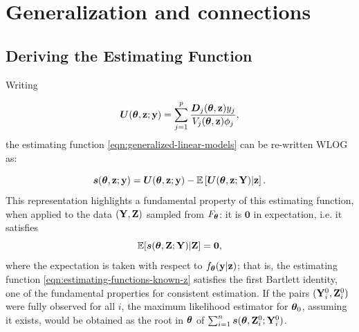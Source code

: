 \documentclass[twoside,11pt]{article}
\newcommand{\E}{{\mathbb{E}}}
\begin{document}
\section{Generalization and connections}

\subsection{Deriving the Estimating Function}

 Writing

\begin{equation}
    \bm U({\bm{\theta}}, {\bf z};{\bf y}) = \sum_{j=1}^p\frac{\bm D_j({\bm{\theta}}, {\bf z}) y_{j} }{V_j({\bm{\theta}}, {\bf z})\phi_j},
    \label{eqn:Psi}
\end{equation}
%
the estimating function \eqref{eqn:generalized-linear-models} can be re-written WLOG as:

%
\begin{equation}
\bm s(\bt, \z; \y) = \bm U(\bt, \z; \y) - \E\left[\bm U(\bt, \z; \Y)\Large\vert\z \right].
\label{eqn:estimating-functions-known-z}
\end{equation}
%
This representation highlights a fundamental property of this estimating function, when applied to the data $({\bf Y}, {\bf Z})$ sampled from $F_{\bm{\theta}}$: it is $\bm 0$ in expectation, i.e. it satisfies
%
$$
\E[\bm s(\bt, \Z; \Y)|\Z] = \bm 0,
$$
%
where the expectation is taken with respect to $f_{\bm{\theta}}({\bf y}|{\bf z})$; that is, the estimating function \eqref{eqn:estimating-functions-known-z} satisfies the first Bartlett identity, one of the fundamental properties for consistent estimation. If the pairs $({\bf Y}_i^0, {\bf Z}_i^0)$ were fully observed for all $i$, the maximum likelihood estimator for ${\bm{\theta}}_0$, assuming it exists, would be obtained as the root in ${\bm{\theta}}$ of
%
$\sum_{i=1}^n \bm s({\bm{\theta}}, {\bf Z}_i^0; {\bf Y}_i^0)$.
%
\end{document}
